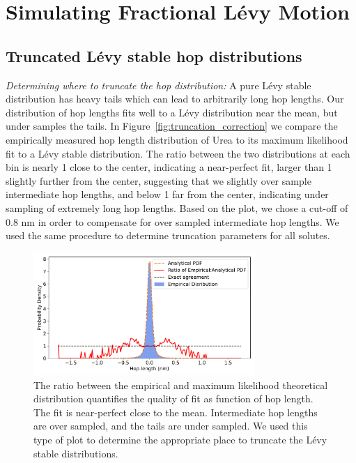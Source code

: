 \documentclass{article}
\begin{document}
  \section{Simulating Fractional L\'evy Motion}\label{section:sFLM}

  \subsection{Truncated L\'evy stable hop distributions}\label{section:truncation}
  
  \textit{Determining where to truncate the hop distribution:} A pure
  L\'evy stable distribution has heavy tails which can lead to arbitrarily
  long hop lengths. Our distribution of hop lengths fits well to a L\'evy
  distribution near the mean, but under samples the tails. In 
  Figure~\ref{fig:truncation_correction} we compare the empirically 
  measured hop length distribution of Urea to its maximum likelihood fit to
  a L\'evy stable distribution. The ratio between the two distributions 
  at each bin is nearly 1 close to the center, indicating a near-perfect
  fit, larger than 1 slightly further from the center, suggesting that 
  we slightly over sample intermediate hop lengths, and below 1 far from 
  the center, indicating under sampling of extremely long hop lengths.
  Based on the plot, we chose a cut-off of 0.8 nm in order to compensate for
  over sampled intermediate hop lengths. We used the same procedure
  to determine truncation parameters for all solutes.
  
  \begin{figure}
  \centering
  \includegraphics[width=0.75\textwidth]{truncation_cutoff.pdf}
  \caption{The ratio between the empirical and maximum likelihood theoretical
  distribution quantifies the quality of fit as function of hop length. The fit
  is near-perfect close to the mean. Intermediate hop lengths are over sampled, 
  and the tails are under sampled. We used this type of plot to determine the
  appropriate place to truncate the L\'evy stable distributions.}\label{fig:truncation_cutoff}
  \end{figure}
  
\end{document}
